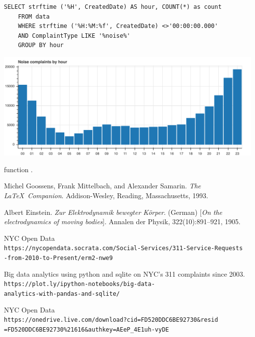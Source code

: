 \documentclass[12pt,a4paper]{article}
\begin{document}
\begin{verbatim}
SELECT strftime ('%H', CreatedDate) AS hour, COUNT(*) as count
    FROM data
    WHERE strftime ('%H:%M:%f', CreatedDate) <>'00:00:00.000'
    AND ComplaintType LIKE '%noise%'
    GROUP BY hour
\end{verbatim}

\includegraphics[scale=0.3]{noisecomplaintsbyhour}

function \cite{nycdatafull}.


\begin{thebibliography}{9}
Michel Goossens, Frank Mittelbach, and Alexander Samarin.
\textit{The \LaTeX\ Companion}.
Addison-Wesley, Reading, Massachusetts, 1993.

Albert Einstein.
\textit{Zur Elektrodynamik bewegter K{\"o}rper}. (German)
[\textit{On the electrodynamics of moving bodies}].
Annalen der Physik, 322(10):891–921, 1905.

NYC Open Data
\\\texttt{https://nycopendata.socrata.com/Social-Services/311-Service-Requests\\-from-2010-to-Present/erm2-nwe9}


Big data analytics using python and sqlite on NYC's 311 complaints since 2003.
\\\texttt{https://plot.ly/ipython-notebooks/big-data-\\analytics-with-pandas-and-sqlite/}

NYC Open Data
\\\texttt{https://onedrive.live.com/download?cid=FD520DDC6BE92730\&resid\\=FD520DDC6BE92730\%21616\&authkey=AEeP\_4E1uh-vyDE}


\end{thebibliography}
\end{document}
